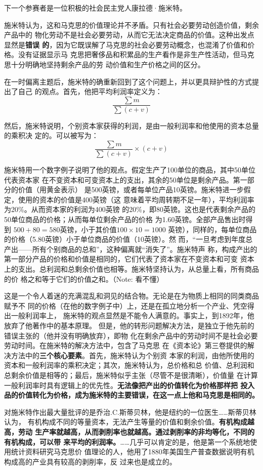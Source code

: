 下一个参赛者是一位积极的社会民主党人康拉德·施米特。

施米特认为，这和马克思的价值理论并不矛盾。只有社会必要劳动创造价值，剩余产品中的
物化劳动不是社会必要劳动，从而它无法决定商品的价值。这种出发点显然是\textbf{错误
  的}，因为它既误解了马克思的社会必要劳动概念，也混淆了价值和价格。没有证据显示马
克思把奢侈品和积累品的生产看作是非生产性活动，但马克思十分明确地坚持剩余产品的劳
动价值和生产价格之间的区分。

在一时偏离主题后，施米特的确重新回到了这个问题上，并以更具辩护性的方式提出了自己
的观点。首先，他把平均利润率定义为：
\[\frac{\sum m}{\sum(c+v)}\]

然后，施米特说明，个别资本家获得的利润，是由一般利润率和他使用的资本总量的乘积决
定的。可以被写为：
\[ \frac{\sum m}{\sum(c+v)} \times (c+v) \]

施米特用一个数字例子说明了他的观点。假定生产了100单位的商品，其中50单位代表资本家
在不变资本和可变资本上的支出，其余的50单位是剩余产品。第一部分的价值（用黄金表示）
是500英镑，或者每单位产品10英镑。施米特进一步假定，使用的资本的价值是400英镑（这
意味着平均周转期不足一年），平均利润率为20\%。从而资本家的利润为400英镑
的20\%，即80英镑。这也是代表剩余产品的50单位商品的价格；从而每单位剩余产品的价格
为1.60英镑。全部产品售出时得到 $500+80=580$英镑，小于其价值$100 \times 10=1000$
英镑），同样的，每单位商品的价格（5.80英镑）小于单位商品的价值（10英镑）。然
而，“一旦考虑到年度总产出——所有个别商品的总和”，这种偏离就“消失了”。施米特声
称，构成产出的第一部分产品的价格和价值是相同的，它们代表了资本家在不变资本和可变
资本上的支出。总利润和总剩余价值也相等。施米特坚持认为，从总量上看，所有商品的价
格之和等于它们的价值之和。（Note: 看不懂）

这是一个令人着迷的充满混乱和洞见的结合物。无论是在为物质上相同的同类商品赋予不
同的价格（在他的数字例子中）上，还是在孤立地分析一个产业、凭空得出一般利润率上，
施米特的观点显然是不能令人满意的。事实上，到1892年，他放弃了他著作中的基本原理。
但是，他的转形问题解决方法，是独立于他先前的错误主张的（他并没有明确放弃），即物
化在剩余产品中的劳动时间不是社会必要劳动时间。在施米特的解决方法中，包含了马克思
在《资本论》第三卷提供的解决方法中的\textbf{三个核心要素}。首先，施米特认为个别资
本家的利润，由他所使用的资本和一般利润率的乘积决定；其次，施米特认为，总价格和总
价值、总利润和总剩余价值是相等的；最后，施米特似乎主张（尽管不是很清晰），价值量
在计算一般利润率时具有逻辑上的优先性。\textbf{无法像把产出的价值转化为价格那样把
  投入品的价值转化为价格，成为施米特的主要错误，在这一点上他和马克思是相同的。}

对施米特作出最大量批评的是乔治.C.斯蒂贝林，他是纽约的一位医生……斯蒂贝林认为，
有机构成不同的等量资本，无法产生等量的价值和剩余价值。\textbf{有机构成越高，劳动
  生产率就越高，从而剥削率也就越高。通过剥削率的非均等化，不同的有机构成，可以带
  来平均的利润率。}……几乎可以肯定的是，他是第一个系统地使用统计资料研究马克思价
值理论的人，他用了1880年美国生产普查数据说明有机构成高的产业具有较高的剥削率，反
过来也是成立的。

